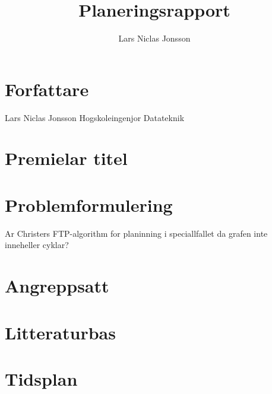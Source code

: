 \documentclass{article}
\begin{document}
\title{Planeringsrapport}

\author{Lars Niclas Jonsson}

\maketitle

\section{Forfattare}
Lars Niclas Jonsson
Hogskoleingenjor Datateknik

\section{Premielar titel}

\section{Problemformulering}
Ar Christers FTP-algorithm for planinning i speciallfallet da grafen inte inneheller cyklar?

\section{Angreppsatt}

\section{Litteraturbas}


\section{Tidsplan}
\end{document}
